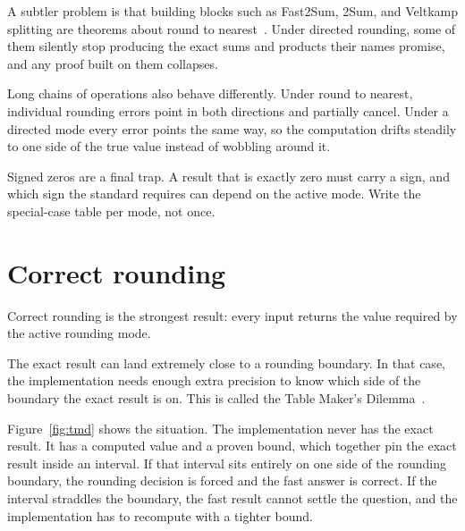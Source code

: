 \documentclass[manuscript, nonacm]{acmart}
\begin{document}
  A subtler problem is that building blocks such as Fast2Sum, 2Sum, and
  Veltkamp splitting are theorems about round to
  nearest~\cite{muller,handbook}. Under directed rounding, some of them
  silently stop producing the exact sums and products their names promise,
  and any proof built on them collapses.

  Long chains of operations also behave differently. Under round to
  nearest, individual rounding errors point in both directions and
  partially cancel. Under a directed mode every error points the same
  way, so the computation drifts steadily to one side of the true value
  instead of wobbling around it.

  Signed zeros are a final trap. A result that is exactly zero must carry
  a sign, and which sign the standard requires can depend on the active
  mode. Write the special-case table per mode, not once.



  \section{Correct rounding}

  Correct rounding is the strongest result: every input returns the value
  required by the active rounding mode.

  The exact result can land extremely close to a rounding boundary. In that
  case, the implementation needs enough extra precision to know which side of
  the boundary the exact result is on. This is called the Table Maker's
  Dilemma~\cite{muller,handbook}.

  Figure~\ref{fig:tmd} shows the situation. The implementation never has
  the exact result. It has a computed value and a proven bound, which
  together pin the exact result inside an interval. If that interval sits
  entirely on one side of the rounding boundary, the rounding decision is
  forced and the fast answer is correct. If the interval straddles the
  boundary, the fast result cannot settle the question, and the
  implementation has to recompute with a tighter bound.
\end{document}
